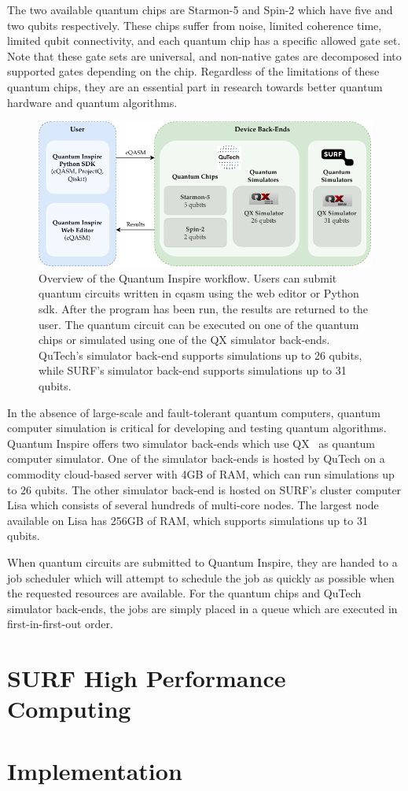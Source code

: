 The two available quantum chips are Starmon-5 and Spin-2 which have five and two qubits respectively.
These chips suffer from noise, limited coherence time, limited qubit connectivity, and each quantum chip has a specific allowed gate set.
Note that these gate sets are universal, and non-native gates are decomposed into supported gates depending on the chip.
Regardless of the limitations of these quantum chips, they are an essential part in research towards better quantum hardware and quantum algorithms.
\begin{figure}[ht]
    \centering
    \includegraphics[width=1\linewidth]{figures/qi-workflow.pdf}
    \caption[Overview of the Quantum Inspire workflow.]{
        Overview of the Quantum Inspire workflow.
        Users can submit quantum circuits written in \gls{cqasm} using the web editor or Python \gls{sdk}.
        After the program has been run, the results are returned to the user.
        The quantum circuit can be executed on one of the quantum chips or simulated using one of the QX simulator back-ends.
        QuTech's simulator back-end supports simulations up to 26 qubits, while SURF's simulator back-end supports simulations up to 31 qubits.
    }
    \label{fig:qi-workflow}
\end{figure}

In the absence of large-scale and fault-tolerant quantum computers, quantum computer simulation is critical for developing and testing quantum algorithms.
Quantum Inspire offers two simulator back-ends which use QX~\cite{khammassi2017qx} as quantum computer simulator.
One of the simulator back-ends is hosted by QuTech on a commodity cloud-based server with 4GB of RAM, which can run simulations up to 26 qubits.
The other simulator back-end is hosted on SURF's cluster computer Lisa which consists of several hundreds of multi-core nodes.
The largest node available on Lisa has 256GB of RAM, which supports simulations up to 31 qubits.

When quantum circuits are submitted to Quantum Inspire, they are handed to a job scheduler which will attempt to schedule the job as quickly as possible when the requested resources are available.
For the quantum chips and QuTech simulator back-ends, the jobs are simply placed in a queue which are executed in first-in-first-out order.

\section{SURF High Performance Computing}

\section{Implementation}